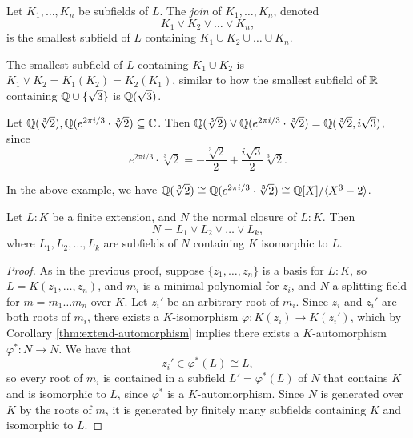 \begin{definition}
  Let $K_1, \dots, K_n$ be subfields of $L$. The
  \emph{join} of $K_1, \dots, K_n$, denoted
  \[
    K_1 \lor K_2 \lor \dots \lor K_n,
  \]
  is the smallest subfield of $L$ containing
  $K_1 \cup K_2 \cup \dots \cup K_n$.
\end{definition}

\begin{remark}
  The smallest subfield of $L$ containing
  $K_1 \cup K_2$ is $K_1 \lor K_2 = K_1(K_2) = K_2(K_1)$,
  similar to how the smallest subfield of $\mathbb{R}$
  containing $\mathbb{Q} \cup \{\sqrt{3}\}$ is $\mathbb{Q}(\sqrt{3})$.
\end{remark}

\begin{example}
  Let $\mathbb{Q}(\sqrt[3]{2}), \mathbb{Q}(e^{2\pi i / 3} \cdot \sqrt[3]{2}) \subseteq \mathbb{C}$.
  Then
  $\mathbb{Q}(\sqrt[3]{2}) \lor \mathbb{Q}(e^{2\pi i / 3} \cdot \sqrt[3]{2}) = \mathbb{Q}(\sqrt[3]{2}, i\sqrt{3})$, since
  \[
    e^{2\pi i / 3} \cdot \sqrt[3]{2} = -\frac{\sqrt[3]{2}}{2} + \frac{i\sqrt{3}}{2} \sqrt[3]{2}.
  \]
\end{example}

\begin{remark}
  In the above example, we have
  $\mathbb{Q}(\sqrt[3]{2}) \cong \mathbb{Q}(e^{2\pi i / 3} \cdot \sqrt[3]{2}) \cong \mathbb{Q}[X] / \langle X^3 - 2 \rangle$.
\end{remark}

\begin{corollary}
  Let $L : K$ be a finite extension, and $N$ the normal
  closure of $L : K$. Then
  \[
    N = L_1 \lor L_2 \lor \dots \lor L_k,
  \]
  where $L_1, L_2, \dots, L_k$ are subfields of $N$
  containing $K$ isomorphic to $L$.
\end{corollary}

\begin{proof}
  As in the previous proof, suppose $\{z_1, \dots, z_n\}$
  is a basis for $L : K$, so $L = K(z_1, \dots, z_n)$,
  and $m_i$ is a minimal polynomial for $z_i$, and $N$
  a splitting field for $m = m_1 \dots m_n$ over $K$.
  Let $z_i'$ be an arbitrary root of $m_i$. Since
  $z_i$ and $z_i'$ are both roots of $m_i$, there exists
  a $K$-isomorphism $\varphi : K(z_i) \to K(z_i')$,
  which by Corollary \ref{thm:extend-automorphism} implies
  there exists a $K$-automorphism
  $\varphi^* : N \to N$. We have that
  \[
    z_i' \in \varphi^*(L) \cong L,
  \]
  so every root of $m_i$ is contained in a subfield
  $L' = \varphi^*(L)$ of $N$ that contains $K$ and is
  isomorphic to
  $L$, since $\varphi^*$ is a $K$-automorphism. Since
  $N$ is generated over $K$ by the roots of $m$, it is
  generated by finitely many subfields containing $K$
  and isomorphic to $L$.
\end{proof}


